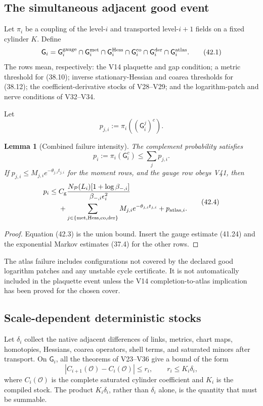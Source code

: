 \documentclass[11pt]{article}
\newtheorem{lemma}[theorem]{Lemma}
\begin{document}
\subsection{The simultaneous adjacent good event}

Let \(\pi_i\) be a coupling of the level-\(i\) and transported
level-\(i+1\) fields on a fixed cylinder \(K\).  Define
\[
 \mathsf G_i
 =
 \mathsf G_i^{\rm gauge}
 \cap\mathsf G_i^{\rm met}
 \cap\mathsf G_i^{\rm Hess}
 \cap\mathsf G_i^{\rm co}
 \cap\mathsf G_i^{\rm der}
 \cap\mathsf G_i^{\rm atlas}.
 \tag{42.1}
\]
The rows mean, respectively: the V14 plaquette and gap condition; a
metric threshold for (38.10); inverse stationary-Hessian and coarea
thresholds for (38.12); the coefficient-derivative stocks of V28--V29;
and the logarithm-patch and nerve conditions of V32--V34.

Let
\[
 p_{j,i}:=\pi_i((\mathsf G_i^j)^c).
 \tag{42.2}
\]

\begin{lemma}[Combined failure intensity]
\label{lem:v11v42-union}
The complement probability satisfies
\[
 p_i:=\pi_i(\mathsf G_i^c)
 \leq
 \sum_jp_{j,i}.
 \tag{42.3}
\]
If \(p_{j,i}\leq M_{j,i}e^{-\theta_{j,i}t_{j,i}}\) for the moment rows,
and the gauge row obeys V41, then
\[
 \begin{split}
 p_i\leq{}&
 C_{\rm g}
 \frac{
 N_{\mathcal P}(L_i)[1+\log\beta_{-,i}]
 }{
 \beta_{-,i}\epsilon_i^2
 }\\
 &+
 \sum_{j\in\{{\rm met,Hess,co,der}\}}
 M_{j,i}e^{-\theta_{j,i}t_{j,i}}
 +p_{{\rm atlas},i}.
 \end{split}
 \tag{42.4}
\]
\end{lemma}

\begin{proof}
Equation (42.3) is the union bound.  Insert the gauge estimate (41.24)
and the exponential Markov estimates (37.4) for the other rows.
\end{proof}

The atlas failure includes configurations not covered by the declared
good logarithm patches and any unstable cycle certificate.  It is not
automatically included in the plaquette event unless the V14
completion-to-atlas implication has been proved for the chosen cover.

\subsection{Scale-dependent deterministic stocks}

Let \(\delta_i\) collect the native adjacent differences of links,
metrics, chart maps, homotopies, Hessians, coarea operators, shell
terms, and saturated minors after transport.  On \(\mathsf G_i\), all
the theorems of V23--V36 give a bound of the form
\[
 |C_{i+1}(\mathcal O)-C_i(\mathcal O)|
 \leq
 r_i,\qquad
 r_i\leq K_i\delta_i,
 \tag{42.5}
\]
where \(C_i(\mathcal O)\) is the complete saturated cylinder
coefficient and \(K_i\) is the compiled stock.  The product
\(K_i\delta_i\), rather than \(\delta_i\) alone, is the quantity that
must be summable.
\end{document}
